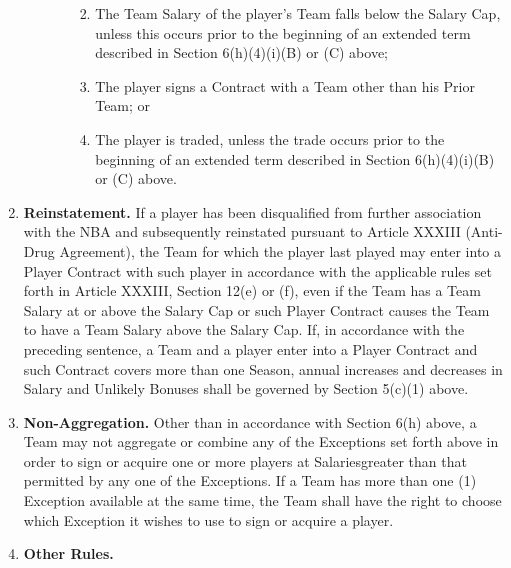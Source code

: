 \documentclass[
]{book}
\providecommand{\tightlist}{%
  \setlength{\itemsep}{0pt}\setlength{\parskip}{0pt}}
\begin{document}
\begin{enumerate}
\begin{enumerate}
\begin{enumerate}
      \begin{enumerate}
      \def\labelenumiv{(\Alph{enumiv})}
      \tightlist
      \item
        The Team Salary of the player's Team falls below the Salary Cap, unless this occurs prior to the beginning of an extended term described in Section 6(h)(4)(i)(B) or (C) above;
      \item
        The player signs a Contract with a Team other than his Prior Team; or
      \item
        The player is traded, unless the trade occurs prior to the beginning of an extended term described in Section 6(h)(4)(i)(B) or (C) above.
      \end{enumerate}
    \end{enumerate}
  \end{enumerate}
\item
  \textbf{Reinstatement.} If a player has been disqualified from further association with the NBA and subsequently reinstated pursuant to Article XXXIII (Anti-Drug Agreement), the Team for which the player last played may enter into a Player Contract with such player in accordance with the applicable rules set forth in Article XXXIII, Section 12(e) or (f), even if the Team has a Team Salary at or above the Salary Cap or such Player Contract causes the Team to have a Team Salary above the Salary Cap. If, in accordance with the preceding sentence, a Team and a player enter into a Player Contract and such Contract covers more than one Season, annual increases and decreases in Salary and Unlikely Bonuses shall be governed by Section 5(c)(1) above.
\item
  \textbf{Non-Aggregation.} Other than in accordance with Section 6(h) above, a Team may not aggregate or combine any of the Exceptions set forth above in order to sign or acquire one or more players at Salariesgreater than that permitted by any one of the Exceptions. If a Team has more than one (1) Exception available at the same time, the Team shall have the right to choose which Exception it wishes to use to sign or acquire a player.
\item
  \textbf{Other Rules.}


\end{enumerate}
\end{document}
